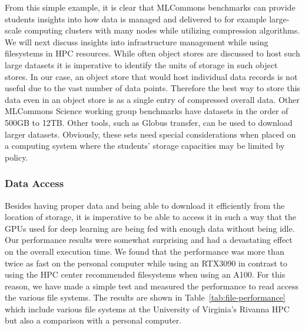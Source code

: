 From this simple example, it is clear that MLCommons benchmarks can provide students insights into how data is managed and delivered to for example large-scale computing clusters with many nodes while utilizing compression algorithms. We will next discuss insights into infrastructure management while using filesystems in HPC resources.  While often object stores are discussed to host such large datasets it is imperative to identify the units of storage in such object stores.  In our case, an object store that would host individual data records is not useful due to the vast number of data points. Therefore the best way to store this data even in an object store is as a single entry of compressed overall data.  Other MLCommons Science working group benchmarks have datasets in the order of 500GB to 12TB. Other tools, such as Globus transfer, can be used to download larger datasets.  Obviously, these sets need special considerations when placed on a computing system where the students' storage capacities may be limited by policy.


\subsubsection{Data Access}

Besides having proper data and being able to download it efficiently from the location of storage, it is imperative to be able to access it in such a way that the GPUs used for deep learning are being fed with enough data without being idle. Our performance results were somewhat surprising and had a devastating effect on the overall execution time. We found that the performance was more than twice as fast on the personal computer while using an RTX3090 in contrast to using the HPC center recommended filesystems when using an A100. For this reason, we have made a simple test and measured the performance to read access the various file systems. The results are shown in Table~\ref{tab:file-performance} which include various file systems at the University of Virginia's Rivanna HPC but also a comparison with a personal computer.

